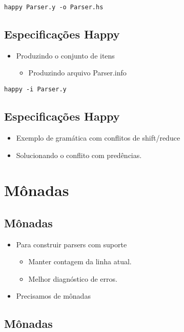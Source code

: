 \documentclass[11pt]{article}
\begin{document}
\begin{verbatim}
happy Parser.y -o Parser.hs
\end{verbatim}
\subsection*{Especificações Happy}
\label{sec:org975284d}

\begin{itemize}
\item Produzindo o conjunto de itens
\begin{itemize}
\item Produzindo arquivo Parser.info
\end{itemize}
\end{itemize}

\begin{verbatim}
happy -i Parser.y
\end{verbatim}
\subsection*{Especificações Happy}
\label{sec:org3ee4795}

\begin{itemize}
\item Exemplo de gramática com conflitos de shift/reduce

\item Solucionando o conflito com predências.
\end{itemize}
\section*{Mônadas}
\label{sec:orgdd561a7}

\subsection*{Mônadas}
\label{sec:orgee0464f}

\begin{itemize}
\item Para construir parsers com suporte
\begin{itemize}
\item Manter contagem da linha atual.
\item Melhor diagnóstico de erros.
\end{itemize}
\item Precisamos de mônadas
\end{itemize}
\subsection*{Mônadas}
\label{sec:orgd7875d9}
\end{document}
